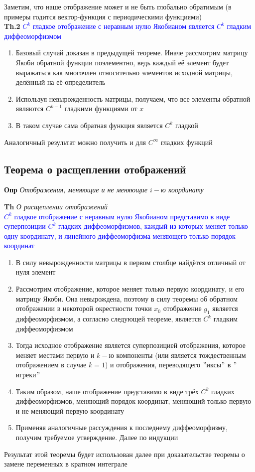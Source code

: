 Заметим, что наше отображение может и не быть глобально обратимым (в примеры годится вектор-функция с периодическими
функциями) \\

\textbf{Th.2} \textcolor{blue}{$C^k$ гладкое отображение с неравным нулю Якобианом
является $C^k$ гладким диффеоморфизмом}

\begin{enumerate}
    \item Базовый случай доказан в предыдущей теореме.
    Иначе рассмотрим матрицу Якоби обратной функции поэлементно, ведь каждый её элемент будет выражаться как многочлен
    относительно элементов исходной матрицы, делённый на её определитель
    \item Используя невырожденность матрицы, получаем, что все элементы обратной являются $C^{k-1}$ гладкими
    функциями от $x$
    \item В таком случае сама обратная функция является $C^k$ гладкой
\end{enumerate}
Аналогичный результат можно получить и для $C^{\infty}$ гладких функций

\subsection{Теорема о расщеплении отображений}

\textbf{Опр} \textit{Отображения, меняющие и не меняющие $i-$ю координату}

\textbf{Th} \textit{О расщеплении отображений} \\
\textcolor{blue}{$C^k$ гладкое отображение с неравным нулю Якобианом представимо в виде суперпозиции $C^k$ гладких
диффеоморфизмов, каждый из которых меняет только одну координату, и линейного диффеоморфизма меняющего только порядок
координат}

\begin{enumerate}
    \item В силу невырожденности матрицы в первом столбце найдётся отличный от нуля элемент
    \item Рассмотрим отображение, которое меняет  только  первую  координату, и его матрицу Якоби.
    Она невырождена, поэтому в силу теоремы об обратном отображении в некоторой окрестности точки $x_0$ отображение $
    g_1$ является диффеоморфизмом, а согласно следующей теореме, является $C^k$ гладким диффеоморфизмом
    \item Тогда исходное отображение является суперпозицией отображения, которое меняет местами первую и $k-$ю
    компоненты (или является тождественным отображением в случае $k = 1$) и отображения, переводящего \("\)иксы\("\) в \("\)игреки\("\)
    \item Таким образом, наше отображение представимо в виде трёх $C^k$ гладких диффеоморфизмов, меняющий порядок
    координат, меняющий только первую и не меняющий первую координату
    \item Применяя аналогичные рассуждения к последнему диффеоморфизму, получим требуемое утверждение.
    Далее по индукции
\end{enumerate}

Результат этой теоремы будет использован далее при доказательстве теоремы о замене переменных в кратном интеграле

